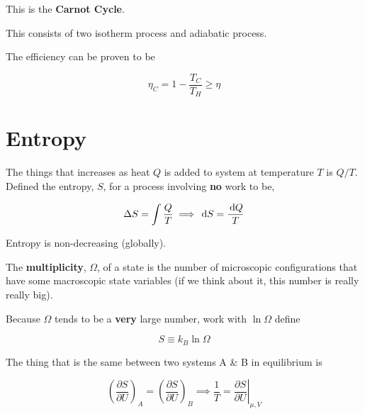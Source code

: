This is the \textbf{Carnot Cycle}.

This consists of two isotherm process and adiabatic process.

The efficiency can be proven to be

\begin{equation}
	\eta_C = 1 - \frac{T_C}{T_H} \geq \eta
\end{equation}

\section{Entropy}

The things that increases as heat $Q$ is added to system at temperature $T$ is $Q/T$. Defined the entropy, $S$, for a process involving \textbf{no} work to be,

\begin{equation}
	\Delta S = \int \frac{Q}{T} \implies \D S = \frac{\D Q}{T}
\end{equation}

\begin{definition}
	Entropy is non-decreasing (globally).
\end{definition}

The \textbf{multiplicity}, $\Omega$, of a state is the number of microscopic configurations that have some macroscopic state variables (if we think about it, this number is really really big).

Because $\Omega$ tends to be a \textbf{very} large number, work with $\ln \Omega$ define

\begin{equation}
	S \equiv k_B \ln \Omega
\end{equation}

The thing that is the same between two systems A \& B in equilibrium is

\begin{equation}
	\left(\frac{\partial S}{\partial U}\right)_A = \left(\frac{\partial S}{\partial U}\right)_B \implies \frac{1}{T} = \left.\frac{\partial S}{\partial U}\right|_{\mu, V}
\end{equation}